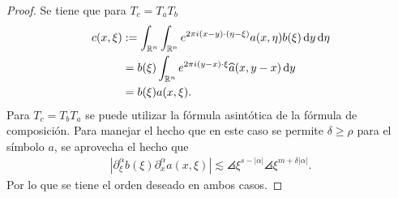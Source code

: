 \begin{proof}
	Se tiene que para $T_c = T_aT_b$
	\begin{align*}
		c(x, \xi) & :=  \int_{\mathbb{R}^n}\int_{\mathbb{R}^n} 
		e^{2\pi i(x-y)\cdot(\eta-\xi)} a(x, \eta)b(\xi)\mathop{}\!\mathrm{d} y \mathop{}\!\mathrm{d} \eta \\ 
		& =  b(\xi)\int_{\mathbb{R}^n}e^{2\pi i(y-x)\cdot\xi} \widehat{a}(x, y-x)\mathop{}\!\mathrm{d} y \\
		& = b(\xi)a(x, \xi).
	\end{align*}
	Para $T_c = T_bT_a$ se puede utilizar la fórmula asintótica de la fórmula de composición. Para manejar el hecho que en este caso se permite $\delta\geq\rho$ para el símbolo $a$, se aprovecha el hecho que 
	\begin{align*}
		|\partial^\alpha_\xi b(\xi) \partial^\alpha_x a(x, \xi)| \lesssim \angles{\xi}^{s-|\alpha|} \angles{\xi}^{m+\delta |\alpha|}.
	\end{align*}
	Por lo que se tiene el orden deseado en ambos casos.
\end{proof}
